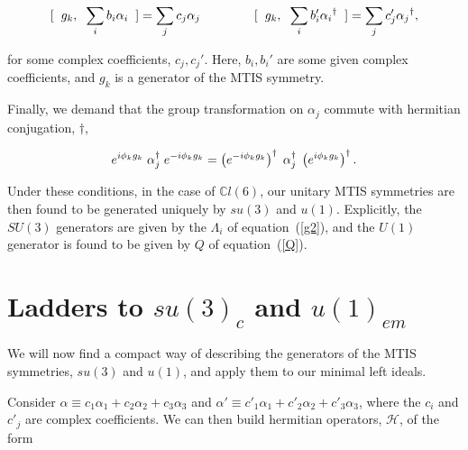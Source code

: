 \documentclass[letterpaper,12pt,titlepage,oneside,final]{book}
\newcommand{\CLsix}{\mathbb{C}l(6)}
\begin{document}
\begin{equation}  \large[ \hspace{2mm} g_k, \hspace{2mm}\sum_i b_i \alpha_i  \hspace{2mm} \large] = \sum_j c_j \alpha_j   \hspace{1.5cm}  \large[  \hspace{2mm}g_k, \hspace{2mm}\sum_i b_i' {\alpha_i}^{\dagger}  \hspace{2mm} \large] = \sum_j c_j' {\alpha_j}^{\dagger} ,
\end{equation}

\noindent for some complex coefficients, $c_j, c_j'$.  Here, $b_i, b_i'$ are some given complex coefficients, and  $g_k$ is a generator of the MTIS symmetry.  

Finally, we demand that the group transformation on $\alpha_j$ commute with hermitian conjugation, $\dagger$,

\begin{equation}  e^{i\phi_k g_k}\hspace{1mm} \alpha^{\dagger}_j\hspace{1mm} e^{-i\phi_k g_k} = \left(e^{-i\phi_k g_k}\right)^{\dagger}\hspace{1mm} \alpha^{\dagger}_j \hspace{1mm}\left(e^{i\phi_k g_k}\right)^{\dagger}.
\end{equation}

Under these conditions, in the case of $\CLsix$, our unitary MTIS symmetries are then found to be generated uniquely by $su(3)$ and $u(1)$.  Explicitly, the $SU(3)$ generators are given by the $\Lambda_i$ of equation~(\ref{g2}), and the $U(1)$ generator is found to be given by $Q$ of equation~(\ref{Q}).





\section{Ladders to $su(3)_c$ and $u(1)_{em}$ \label{ladders}  }

 We will now find a compact way of describing the generators of the MTIS symmetries, $su(3)$ and $u(1)$, and apply them to our minimal left ideals.

Consider $\alpha \equiv c_1\alpha_1 + c_2\alpha_2 +c_3\alpha_3$ and $\alpha' \equiv c'_1\alpha_1 + c'_2\alpha_2 +c'_3\alpha_3$, where the $c_i$ and $c'_j$ are complex coefficients.  We can then build hermitian operators, $\mathcal{H}$, of the form 
\end{document}
